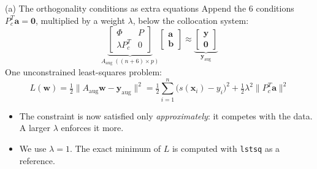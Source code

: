 \documentclass[10pt,aspectratio=169]{beamer}
\newcommand{\x}{\bm{x}}
\begin{document}
\begin{frame}{(a) The orthogonality conditions as extra equations}
  Append the 6 conditions $P_c^T\bm{a}=\bm{0}$, multiplied by a weight
  $\lambda$, below the collocation system:
  \[
    \underbrace{\begin{bmatrix} \Phi & P \\ \lambda P_c^T & 0 \end{bmatrix}}_{A_{\text{aug}}\;((n+6)\times p)}
    \begin{bmatrix} \bm{a} \\ \bm{b} \end{bmatrix}
    \approx
    \underbrace{\begin{bmatrix} \bm{y} \\ \bm{0} \end{bmatrix}}_{\bm{y}_{\text{aug}}}
  \]
  One unconstrained least-squares problem:
  \[
    L(\bm{w}) = \tfrac12 \lVert A_{\text{aug}}\bm{w} - \bm{y}_{\text{aug}} \rVert^2
    = \tfrac12 \sum_{i=1}^{n} \big(s(\x_i) - y_i\big)^2
      + \tfrac12 \lambda^2 \lVert P_c^T \bm{a} \rVert^2
  \]
  \begin{itemize}
    \item The constraint is now satisfied only \emph{approximately}: it
          competes with the data. A larger $\lambda$ enforces it more.
    \item We use $\lambda = 1$. The exact minimum of $L$ is computed with
          \texttt{lstsq} as a reference.
  \end{itemize}
\end{frame}
\end{document}
